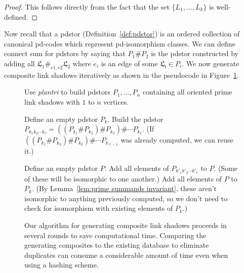 \documentclass[amsmath,secnumarabic,floatfix,amssymb,nofootinbib,nobibnotes,letterpaper,11pt,tightenlines,showkeys]{revtex4}
\theoremstyle{definition}
\let\mgp=\marginpar \marginparwidth18mm \marginparsep1mm
\def\marginpar#1{\mgp{\raggedright\tiny #1}}
\let\lbl=\label
\def\label#1{\lbl{#1}\ifinner\else\marginpar{\ref{#1} #1}\ignorespaces\fi}
\begin{document}
\begin{proof} This follows directly from the fact that the set $\{L_1, \dots, L_k\}$ is well-defined. \end{proof}

Now recall that a pdstor (Definition~\ref{def:pdstor}) is an ordered collection of canonical pd-codes which represent pd-isomorphism classes. We can define connect sum for pdstors by saying that $P_1 \# P_2$ is the pdstor constructed by adding all $\mathfrak{L_1} \#_{e1,e2} \mathfrak{L_2}$ where $e_i$ is an edge of some $\mathfrak{L_i} \in P_i$. We now generate composite link shadows iteratively as shown in the pseudocode in Figure~\ref{alg:build composites}. 

\begin{figure}[ht]
\begin{algorithmic}

\State Use \emph{plantri} to build pdstors $P_1, \dots, P_n$ containing all oriented prime link shadows with $1$ to $n$ vertices.

 	
 \State Define an empty pdstor $P_k$.
    \State  Build the pdstor $P_{k_1k_2\cdots k_\ell} = ((P_{k_1} \# P_{k_2}) \# P_{k_3}) \# \cdots P_{k_\ell}$.
    \State  (If $((P_{k_1} \# P_{k_2}) \# P_{k_3}) \# \cdots P_{k_{\ell-1}}$ was already computed, we can reuse it.)
 \EndFor

    \State Define an empty pdstor $P$.
       \State Add all elements of $P_{k'_1k'_2\cdots k'_\ell}$ to $P$.
      \State (Some of these will be isomorphic to one another.) 
    \EndFor
    \State Add all elements of $P$ to $P_k$. 
    \State (By Lemma~\ref{lem:prime summands invariant}, these aren't isomorphic to anything previously computed,
    \State so we don't need to check for isomorphism with existing elements of $P_k$.)
 \EndFor

\EndFor      
\EndProcedure
\end{algorithmic}
\caption{Our algorithm for generating composite link shadows proceeds in several rounds to save computational time. Comparing the generating composites to the existing database to eliminate duplicates can consume a considerable amount of time even when using a hashing scheme.}
\label{alg:build composites}
\end{figure}
\end{document}
